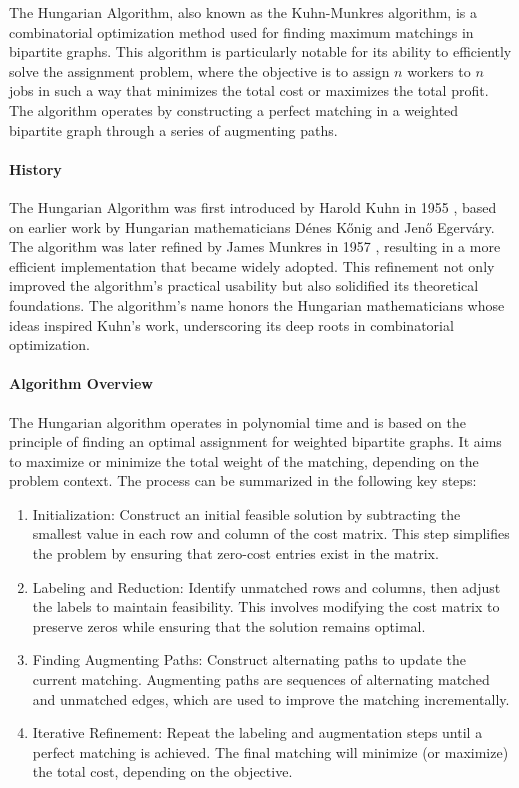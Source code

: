 The Hungarian Algorithm, also known as the Kuhn-Munkres algorithm, is a combinatorial optimization method used for finding maximum matchings in bipartite graphs. This algorithm is particularly notable for its ability to efficiently solve the assignment problem, where the objective is to assign \( n \) workers to \( n \) jobs in such a way that minimizes the total cost or maximizes the total profit. The algorithm operates by constructing a perfect matching in a weighted bipartite graph through a series of augmenting paths.

\paragraph{History}
The Hungarian Algorithm was first introduced by Harold Kuhn in 1955 \cite{kuhn1955hungarian}, based on earlier work by Hungarian mathematicians Dénes Kőnig and Jenő Egerváry. The algorithm was later refined by James Munkres in 1957 \cite{munkres1957algorithms}, resulting in a more efficient implementation that became widely adopted. This refinement not only improved the algorithm's practical usability but also solidified its theoretical foundations. The algorithm’s name honors the Hungarian mathematicians whose ideas inspired Kuhn’s work, underscoring its deep roots in combinatorial optimization.

\paragraph{Algorithm Overview}
The Hungarian algorithm operates in polynomial time and is based on the principle of finding an optimal assignment for weighted bipartite graphs. It aims to maximize or minimize the total weight of the matching, depending on the problem context. The process can be summarized in the following key steps:
\begin{enumerate}
    \item Initialization: Construct an initial feasible solution by subtracting the smallest value in each row and column of the cost matrix. This step simplifies the problem by ensuring that zero-cost entries exist in the matrix.
    \item Labeling and Reduction: Identify unmatched rows and columns, then adjust the labels to maintain feasibility. This involves modifying the cost matrix to preserve zeros while ensuring that the solution remains optimal.
    \item Finding Augmenting Paths: Construct alternating paths to update the current matching. Augmenting paths are sequences of alternating matched and unmatched edges, which are used to improve the matching incrementally.
    \item Iterative Refinement: Repeat the labeling and augmentation steps until a perfect matching is achieved. The final matching will minimize (or maximize) the total cost, depending on the objective.
\end{enumerate}


